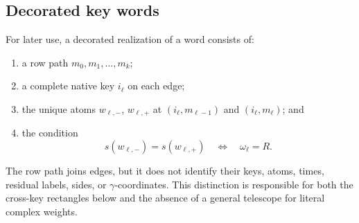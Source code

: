 \subsection{Decorated key words}

For later use, a decorated realization of a word consists of:
\begin{enumerate}[label=\textup{(\roman*)},leftmargin=3em]
 \item a row path \(m_0,m_1,\ldots,m_k\);
 \item a complete native key \(i_\ell\) on each edge;
 \item the unique atoms \(w_{\ell,-}\), \(w_{\ell,+}\) at
       \((i_\ell,m_{\ell-1})\) and \((i_\ell,m_\ell)\); and
 \item the condition
       \[
       s(w_{\ell,-})=s(w_{\ell,+})
       \quad\Longleftrightarrow\quad \omega_\ell=R.
       \]
\end{enumerate}
The row path joins edges, but it does not identify their keys, atoms,
times, residual labels, sides, or \(\gamma\)-coordinates.  This distinction
is responsible for both the cross-key rectangles below and the absence of
a general telescope for literal complex weights.
